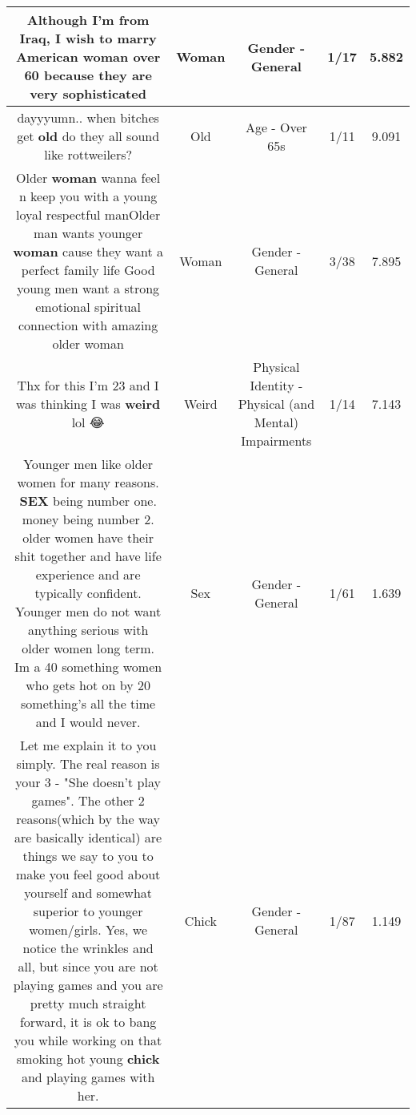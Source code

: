 \documentclass[11pt]{article}
\newlength\mylength
\begin{document}
\begin{center}
\begin{longtable}{|C{.65\mylength}|C{.30\mylength}|C{.12\mylength}|C{.12\mylength}|C{.12\mylength}|}
  \small Although I'm from Iraq, I wish to marry American \textbf{woman} over 60 because they are very sophisticated\normalsize   & Woman & Gender - General & 1/17 & 5.882 \\  \hline
  \small dayyyumn.. when bitches get \textbf{old} do they all sound like rottweilers?\normalsize   & Old & Age - Over 65s & 1/11 & 9.091 \\  \hline
  \small Older \textbf{woman} wanna feel n keep you with a young loyal respectful manOlder man wants younger \textbf{woman} cause they want a perfect family life Good young men want a strong emotional spiritual connection with amazing older woman\normalsize   & Woman & Gender - General & 3/38 & 7.895 \\  \hline
  \small Thx for this I'm 23 and I was thinking I was \textbf{weird} lol 😂\normalsize   & Weird & Physical Identity - Physical (and Mental) Impairments & 1/14 & 7.143 \\  \hline
  \small Younger men like older women for many reasons. \textbf{SEX} being number one. money being number 2. older women have their shit together and have life experience and are typically confident. Younger men do not want anything serious with older women long term. Im a 40 something women who gets hot on by 20 something's all the time and I would never.\normalsize   & Sex & Gender - General & 1/61 & 1.639 \\  \hline
  \small Let me explain it to you simply. The real reason is your 3 - "She doesn't play games". The other 2 reasons(which by the way are basically identical) are things we say to you to make you feel good about yourself and somewhat superior to younger women/girls. Yes, we notice the wrinkles and all, but since you are not playing games and you are pretty much straight forward, it is ok to bang you while working on that smoking hot young \textbf{chick} and playing games with her.\normalsize   & Chick & Gender - General & 1/87 & 1.149 \\  \hline

\end{longtable}
\end{center}
\end{document}

